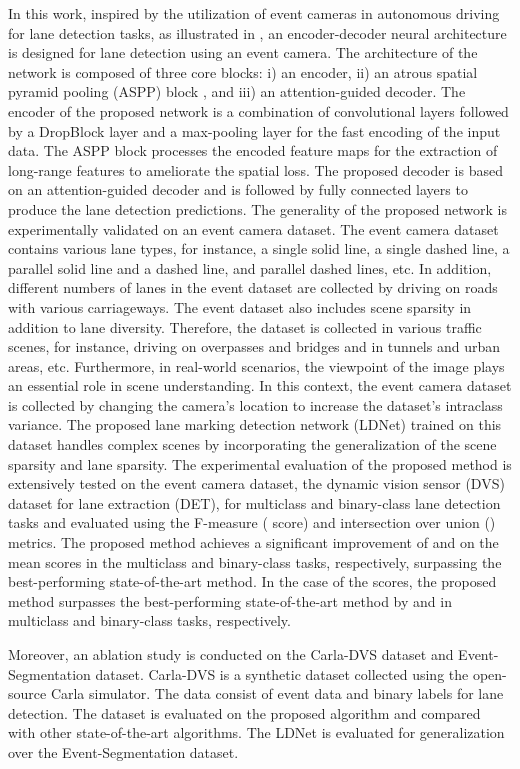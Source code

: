 \documentclass[journal]{IEEEtran}
\begin{document}
\par
In this work, inspired by the utilization of event cameras in autonomous driving for lane detection tasks, as illustrated in \cite{Cheng2019}, an encoder-decoder neural architecture is designed for lane detection using an event camera. The architecture of the network is composed of three core blocks: i) an encoder, ii) an atrous spatial pyramid pooling (ASPP) block \cite{a3} \cite{a4}, and iii) an attention-guided decoder. The encoder of the proposed network is a combination of convolutional layers followed by a DropBlock layer and a max-pooling layer for the fast encoding of the input data. The ASPP block processes the encoded feature maps for the extraction of long-range features to ameliorate the spatial loss. The proposed decoder is based on an attention-guided decoder and is followed by fully connected layers to produce the lane detection predictions. The generality of the proposed network is experimentally validated on an event camera dataset. The event camera dataset contains various lane types, for instance, a single solid line, a single dashed line, a parallel solid line and a dashed line, and parallel dashed lines, etc. In addition, different numbers of lanes in the event dataset are collected by driving on roads with various carriageways. The event dataset also includes scene sparsity in addition to lane diversity. Therefore, the dataset is collected in various traffic scenes, for instance, driving on overpasses and bridges and in tunnels and urban areas, etc. Furthermore, in real-world scenarios, the viewpoint of the image plays an essential role in scene understanding. In this context, the event camera dataset is collected by changing the camera's location to increase the dataset's intraclass variance. The proposed 
lane marking detection network (LDNet) 
trained on this dataset handles complex scenes by incorporating the generalization of the scene sparsity and lane sparsity. The experimental evaluation of the proposed method is extensively tested on the event camera dataset, the dynamic vision sensor (DVS) dataset for lane extraction (DET), for multiclass and binary-class lane detection tasks and evaluated using the F-measure ( score) and intersection over union () metrics. The proposed method achieves a significant improvement of  and  on the mean  scores in the multiclass and binary-class tasks, respectively, surpassing the best-performing state-of-the-art method. In the case of the  scores, the proposed method surpasses the best-performing state-of-the-art method by  and  in multiclass and binary-class tasks, respectively.
\par
Moreover, an ablation study is conducted on the Carla-DVS dataset and Event-Segmentation dataset. Carla-DVS is a synthetic dataset collected using the open-source Carla simulator.  The data consist of event data and binary labels for lane detection. The dataset is evaluated on the proposed algorithm and compared with other state-of-the-art algorithms. The LDNet is evaluated for generalization over the Event-Segmentation dataset.
\end{document}
